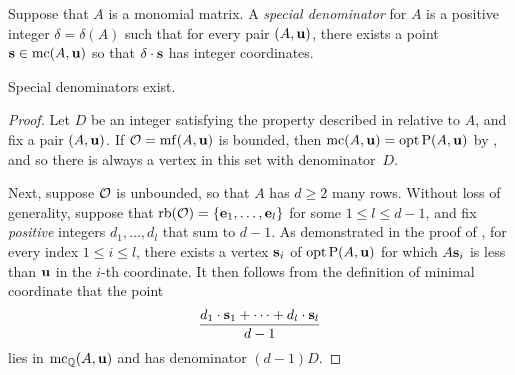 \documentclass[11pt]{amsart}
\begin{document}


\begin{definition}  Suppose that $A$ is a monomial matrix. A \emph{special denominator} for $A$ is a positive integer $\delta = \delta(A)$ such that for every pair $(A, \mathbf{u})$, there exists a point $\mathbf{s} \in \operatorname{mc}(A, \mathbf{u})$ so that $\delta \cdot \mathbf{s}$ has integer coordinates.
\end{definition}

\begin{theorem}  
\label{special-denominators-exist:  T}
Special denominators exist.
\end{theorem}


\begin{proof}
   Let $D$ be an integer satisfying the property described in  relative to $A$, and fix a pair $(A, \mathbf{u})$.
   If $\mathcal{O} = \operatorname{mf}(A, \mathbf{u})$ is bounded, then $\operatorname{mc}(A, \mathbf{u}) = \operatorname{opt} \mathrm{P}(A, \mathbf{u})$ by , and so there is always a vertex in this set with denominator~$D$.

   Next, suppose $\mathcal{O}$ is unbounded, so that $A$ has $d \geq 2$ many rows.
   Without loss of generality, suppose that $\operatorname{rb}(\mathcal{O}) = \{ \mathbf{e}_1, \ldots, \mathbf{e}_l \}$ for some $1 \leq l \leq d-1$, and fix \emph{positive} integers $d_1, \ldots, d_l$ that sum to $d-1$.
   As demonstrated in the  proof of , for every index  $1 \leq i \leq l$, there exists a vertex $\mathbf{s}_i$ of $\operatorname{opt} \mathrm{P}(A, \mathbf{u})$ for which $A \mathbf{s}_i$ is less than $\mathbf{u}$ in the $i$-th coordinate.
   It then follows from the definition of minimal coordinate that the point
   \[ \frac{ d_1 \cdot \mathbf{s}_1 + \cdots + d_l \cdot  \mathbf{s}_l}{d-1}  \]
   lies in $\operatorname{mc}_{\mathbb{Q}}(A, \mathbf{u})$ and has denominator $(d-1)D$.  
\end{proof}
\end{document}
